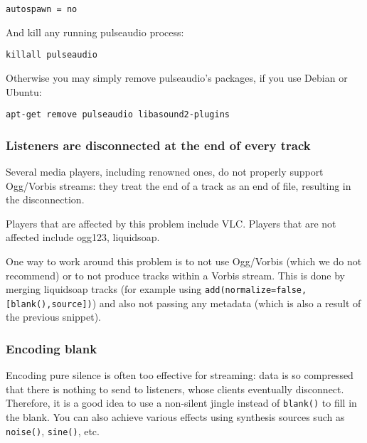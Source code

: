 \begin{verbatim}
autospawn = no
\end{verbatim}
And kill any running pulseaudio process:

\begin{verbatim}
killall pulseaudio
\end{verbatim}
Otherwise you may simply remove pulseaudio's packages, if you use Debian or Ubuntu:

\begin{verbatim}
apt-get remove pulseaudio libasound2-plugins
\end{verbatim}
\subsubsection{Listeners are disconnected at the end of every track}
Several media players, including renowned ones, do not properly support
Ogg/Vorbis streams: they treat the end of a track as an end of file,
resulting in the disconnection.

Players that are affected by this problem include VLC.
Players that are not affected include ogg123, liquidsoap.

One way to work around this problem is to not use Ogg/Vorbis (which we
do not recommend) or to not produce tracks within a Vorbis stream.
This is done by merging liquidsoap tracks (for example using
\verb+add(normalize=false,[blank(),source])+)
and also not passing any metadata
(which is also a result of the previous snippet).

\subsubsection{Encoding blank}
Encoding pure silence is often too effective for streaming: data is so
compressed that there is nothing to send to listeners, whose clients
eventually disconnect. Therefore, it is a good idea to use a non-silent
jingle instead of \verb+blank()+ to fill in the blank. You can
also achieve various effects using synthesis sources such as
\verb+noise()+, \verb+sine()+, etc.

